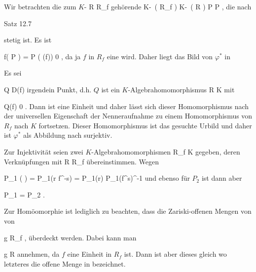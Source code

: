 {





\teilbeweis {}{}{}
{Wir betrachten die zum
$K$-
\maabb {\varphi} { R } { R_f
} {}
gehörende
\maabbeledisp {\varphi^*} { K\!-\!\, \left(  R_f  \right) } { K\!-\!\, \left(  R  \right)
} { P } { P \circ \varphi
} {,}
die nach

Satz 12.7

stetig ist. Es ist

\mavergleichskette
{\vergleichskette
{ f( P \circ \varphi )
}
{ = }{ P ( \varphi (f))
}
{ \neq }{ 0
}
{    }{
}
{   }{
}
}
{}{}{,}
da ja $f$ in $R_f$ eine
wird. Daher liegt das Bild von $\varphi^*$ in
}
{}
\teilbeweis {}{}{}
{Es sei

\mavergleichskette
{\vergleichskette
{ Q
}
{ \in }{ D(f)
}
{  }{
}
{    }{
}
{   }{
}
}
{}{}{}
irgendein Punkt, d.h. $Q$ ist ein $K$-Algebrahomomorphismus
 { R } { K
} {}
mit

\mavergleichskette
{\vergleichskette
{ Q(f)
}
{ \neq }{ 0
}
{  }{
}
{    }{
}
{   }{
}
}
{}{}{.}
Dann ist
 eine Einheit und daher lässt sich dieser Homomorphismus nach der universellen Eigenschaft der Nenneraufnahme
 {} {}
zu einem Homomorphismus von $R_f$ nach $K$ fortsetzen. Dieser Homomorphismus ist das gesuchte Urbild und daher ist $\varphi^*$ als Abbildung nach
 surjektiv.}
{}
\teilbeweis {}{}{}
{Zur Injektivität seien zwei $K$-Algebrahomomorphismen
 { R_f } { K
} {}
gegeben, deren Verknüpfungen mit
\maabbdisp {} { R } { R_f
} {}
übereinstimmen. Wegen

\mavergleichskettedisp
{\vergleichskette
{ P_1 \left(  \right)
}
{ =} { P_1(r f^{-s})
}
{ =} { P_1(r) P_1(f^s)^{-1}
}
{ } {
}
{ } {
}
}
{}{}{}
und ebenso für $P_2$ ist dann aber

\mavergleichskette
{\vergleichskette
{ P_1
}
{ = }{ P_2
}
{  }{
}
{    }{
}
{   }{
}
}
{}{}{.}}
{}
\teilbeweis {}{}{}
{Zur Homöomorphie ist lediglich zu beachten, dass die Zariski-offenen Mengen von
 von

 {}
 {g \in R_f} {}
 {} {} {} {,}
überdeckt werden. Dabei kann man

\mavergleichskette
{\vergleichskette
{ g
}
{ \in }{ R
}
{  }{
}
{    }{
}
{   }{
}
}
{}{}{}
annehmen, da $f$ eine Einheit in $R_f$ ist. Dann ist aber dieses
 gleich
 wo letzteres
 die offene Menge in
 bezeichnet.}
{}




}




